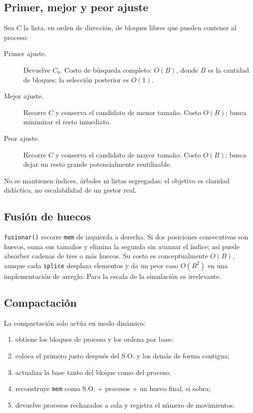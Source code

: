 \documentclass[11pt,a4paper]{article}
\newcommand{\funcion}[1]{\texttt{#1()}}
\begin{document}
\subsection{Primer, mejor y peor ajuste}

Sea \(C\) la lista, en orden de dirección, de bloques libres que pueden contener
al proceso:

\begin{description}
  \item[Primer ajuste.] Devuelve \(C_0\). Costo de búsqueda completo: \(O(B)\),
  donde \(B\) es la cantidad de bloques; la selección posterior es \(O(1)\).
  \item[Mejor ajuste.] Recorre \(C\) y conserva el candidato de menor tamaño.
  Costo \(O(B)\); busca minimizar el resto inmediato.
  \item[Peor ajuste.] Recorre \(C\) y conserva el candidato de mayor tamaño.
  Costo \(O(B)\); busca dejar un resto grande potencialmente reutilizable.
\end{description}

No se mantienen índices, árboles ni listas segregadas; el objetivo es claridad
didáctica, no escalabilidad de un gestor real.

\subsection{Fusión de huecos}

\funcion{fusionar} recorre \texttt{mem} de izquierda a derecha. Si dos posiciones
consecutivas son huecos, suma sus tamaños y elimina la segunda sin avanzar el
índice; así puede absorber cadenas de tres o más huecos. Su costo es conceptualmente
\(O(B)\), aunque cada \texttt{splice} desplaza elementos y da un peor caso
\(O(B^2)\) en una implementación de arreglo. Para la escala de la simulación es
irrelevante.

\subsection{Compactación}

La compactación solo actúa en modo dinámico:

\begin{enumerate}
  \item obtiene los bloques de proceso y los ordena por base;
  \item coloca el primero justo después del S.O. y los demás de forma contigua;
  \item actualiza la base tanto del bloque como del proceso;
  \item reconstruye \texttt{mem} como S.O. + procesos + un hueco final, si sobra;
  \item devuelve procesos rechazados a cola y registra el número de movimientos.
\end{enumerate}
\end{document}
